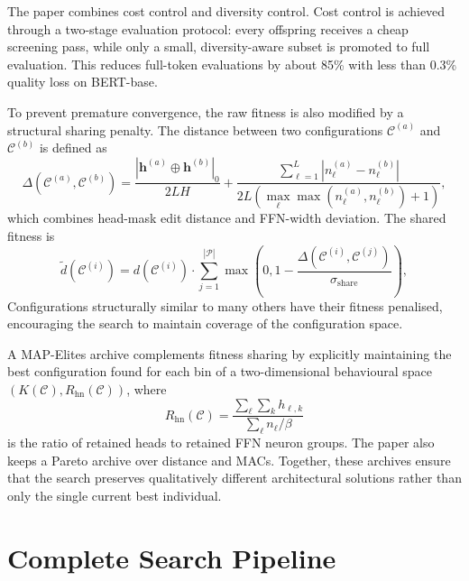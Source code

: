 The paper combines cost control and diversity control. Cost control is achieved through a two-stage evaluation protocol: every offspring receives a cheap screening pass, while only a small, diversity-aware subset is promoted to full evaluation. This reduces full-token evaluations by about 85\% with less than 0.3\% quality loss on BERT-base.

To prevent premature convergence, the raw fitness is also modified by a structural sharing penalty. The distance between two configurations $\mathcal{C}^{(a)}$ and $\mathcal{C}^{(b)}$ is defined as
\begin{equation}
  \Delta(\mathcal{C}^{(a)}, \mathcal{C}^{(b)})
  = \frac{|\mathbf{h}^{(a)} \oplus \mathbf{h}^{(b)}|_0}{2LH}
  + \frac{\sum_{\ell=1}^L |n^{(a)}_\ell - n^{(b)}_\ell|}{2L(\max_\ell\max(n_\ell^{(a)},n_\ell^{(b)})+1)},
  \label{eq:distance}
\end{equation}
which combines head-mask edit distance and FFN-width deviation. The shared fitness is
\begin{equation}
  \tilde{d}(\mathcal{C}^{(i)})
  = d(\mathcal{C}^{(i)}) \cdot
  \sum_{j=1}^{|\mathcal{P}|}
  \max\!\left(0, 1 - \frac{\Delta(\mathcal{C}^{(i)}, \mathcal{C}^{(j)})}{\sigma_{\mathrm{share}}}\right),
  \label{eq:shared_fitness}
\end{equation}
Configurations structurally similar to many others have their fitness penalised, encouraging the search to maintain coverage of the configuration space.

A MAP-Elites archive complements fitness sharing by explicitly maintaining the best configuration found for each bin of a two-dimensional behavioural space $(K(\mathcal{C}), R_{\mathrm{hn}}(\mathcal{C}))$, where
\begin{equation}
  R_{\mathrm{hn}}(\mathcal{C})
  = \frac{\sum_\ell \sum_k h_{\ell,k}}{\sum_\ell n_\ell / \beta}
\end{equation}
is the ratio of retained heads to retained FFN neuron groups. The paper also keeps a Pareto archive over distance and MACs. Together, these archives ensure that the search preserves qualitatively different architectural solutions rather than only the single current best individual.

\section{Complete Search Pipeline}
\label{subsec:pipeline}

